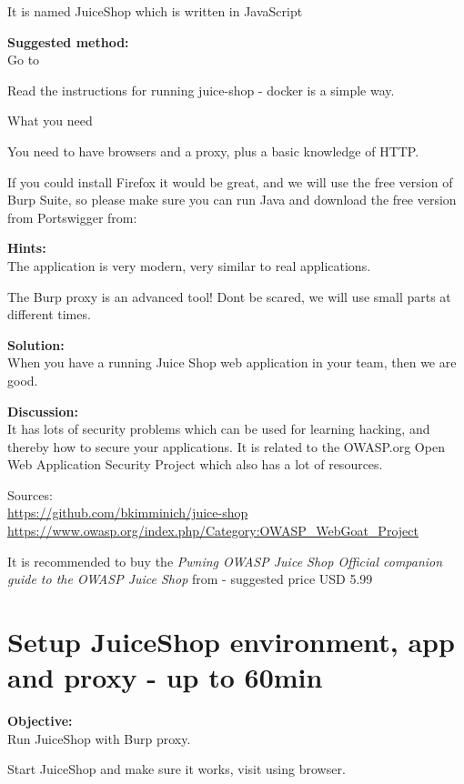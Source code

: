 \documentclass[a4paper,11pt,notitlepage]{report}
\begin{document}
It is named JuiceShop which is written in JavaScript

{\bf Suggested method:}\\
Go to 

Read the instructions for running juice-shop - docker is a simple way.

What you need

You need to have browsers and a proxy, plus a basic knowledge of HTTP.

If you could install Firefox it would be great, and we will use the
free version of Burp Suite, so please make sure you can run Java and
download the free version from Portswigger from:



{\bf Hints:}\\
The application is very modern, very similar to real applications.

The Burp proxy is an advanced tool! Dont be scared, we will use small parts at different times.

{\bf Solution:}\\
When you have a running Juice Shop web application in your team, then we are good.

{\bf Discussion:}\\
It has lots of security problems which can be used for learning
hacking, and thereby how to secure your applications. It is  related
to the OWASP.org Open Web Application Security Project which also has a
lot of resources.

Sources:\\
\url{https://github.com/bkimminich/juice-shop}\\
\url{https://www.owasp.org/index.php/Category:OWASP_WebGoat_Project}

It is recommended to buy the \emph{Pwning OWASP Juice Shop Official companion guide to the OWASP Juice Shop} from  - suggested price USD 5.99



\chapter{Setup JuiceShop environment, app and proxy - up to 60min}
\label{ex:js-burp}

{\bf Objective:}\\
Run JuiceShop with Burp proxy.

Start JuiceShop and make sure it works, visit using browser.
\end{document}
